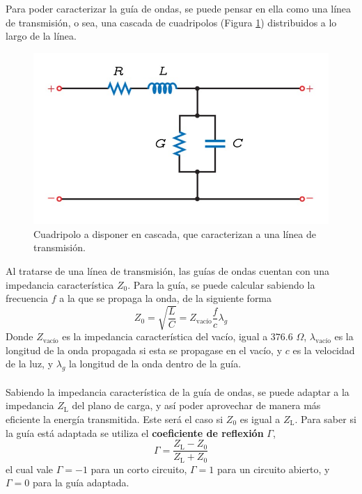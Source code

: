 \documentclass[11pt,a4paper]{article}
\begin{document}
\begin{multicols}{2}
Para poder caracterizar la guía de ondas, se puede pensar en ella como una línea de transmisión, o sea, una cascada de cuadripolos (Figura \ref{fig:cuadri}) distribuidos a lo largo de la línea.
\begin{figure}[H]
\centering
\includegraphics[scale=0.32]{Images/linea de transm.jpeg}
\caption{Cuadripolo a disponer en cascada, que caracterizan a una línea de transmisión.}\label{fig:cuadri}
\end{figure}
Al tratarse de una línea de transmisión, las guías de ondas cuentan con una impedancia característica $Z_0$. Para la guía, se puede calcular sabiendo la frecuencia $f$ a la que se propaga la onda, de la siguiente forma
\begin{equation}
    Z_0=\sqrt{\frac{L}{C}}=Z_\text{vacío}\frac{f}{c}\lambda_g
\end{equation}
Donde $Z_\text{vacío}$ es la impedancia característica del vacío, igual a $376.6$ $\Omega$, $\lambda_\text{vacío}$ es la longitud de la onda propagada si esta se propagase en el vacío, y $c$ es la velocidad de la luz, y $\lambda_g$ la longitud de la onda dentro de la guía.\\ \\
Sabiendo la impedancia característica de la guía de ondas, se puede adaptar a la impedancia  $Z_\text{L}$ del plano de carga, y así poder aprovechar de manera más eficiente la energía transmitida. Este será el caso si $Z_0$ es igual a $Z_\text{L}$. Para saber si la guía está adaptada se utiliza el \textbf{coeficiente de reflexión} $\Gamma$,
\begin{equation}\label{eq:gamma}
    \Gamma = \frac{Z_\text{L}-Z_0}{Z_\text{L}+Z_0}
\end{equation}
el cual vale $\Gamma = -1$ para un corto circuito, $\Gamma = 1$ para un circuito abierto, y $\Gamma = 0$ para la guía adaptada.\\ \\ 

\end{multicols}
\end{document}
